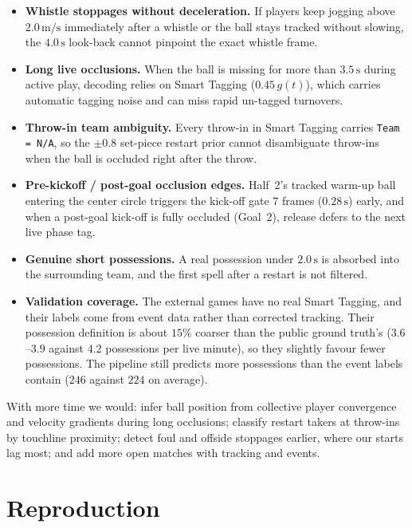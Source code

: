 \documentclass[11pt,a4paper]{article}
\newcommand{\code}[1]{\texttt{#1}}
\begin{document}
\begin{itemize}
  \item \textbf{Whistle stoppages without deceleration.} If players keep jogging above $2.0\,\text{m/s}$
        immediately after a whistle or the ball stays tracked without slowing, the $4.0\,\text{s}$
        look-back cannot pinpoint the exact whistle frame.
  \item \textbf{Long live occlusions.} When the ball is missing for more than $3.5\,\text{s}$ during
        active play, decoding relies on Smart Tagging ($0.45\,g(t)$), which carries automatic
        tagging noise and can miss rapid un-tagged turnovers.
  \item \textbf{Throw-in team ambiguity.} Every throw-in in Smart Tagging carries \code{Team = N/A},
        so the $\pm 0.8$ set-piece restart prior cannot disambiguate throw-ins when the ball is
        occluded right after the throw.
  \item \textbf{Pre-kickoff / post-goal occlusion edges.} Half~2's tracked warm-up ball entering
        the center circle triggers the kick-off gate $7$ frames ($0.28\,\text{s}$) early, and when
        a post-goal kick-off is fully occluded (Goal~2), release defers to the next live phase
        tag.
  \item \textbf{Genuine short possessions.} A real possession under $2.0\,\text{s}$ is absorbed
        into the surrounding team, and the first spell after a restart is not filtered.
  \item \textbf{Validation coverage.} The external games have no real Smart Tagging, and their
        labels come from event data rather than corrected tracking. Their possession definition is
        about $15\%$ coarser than the public ground truth's ($3.6$--$3.9$ against $4.2$
        possessions per live minute), so they slightly favour fewer possessions. The pipeline still
        predicts more possessions than the event labels contain ($246$ against $224$ on average).
\end{itemize}

With more time we would: infer ball position from collective player convergence and velocity
gradients during long occlusions; classify restart takers at throw-ins by touchline proximity;
detect foul and offside stoppages earlier, where our starts lag most; and add more open matches
with tracking and events.

\section{Reproduction}
\end{document}
